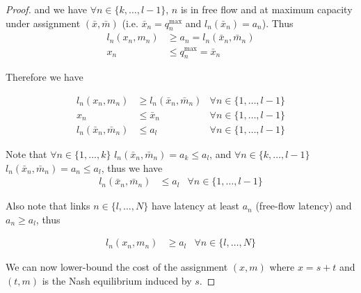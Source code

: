 \begin{proof}
and we have $\forall n \in \{ k, \dots, l-1\}$, $n$ is in free flow and at maximum capacity under assignment $(\bar{x}, \bar{m})$ (i.e. $\bar{x}_n = q^{\max}_n$ and $l_n(\bar{x}_n) = a_n$). Thus
\begin{align*}
l_n(x_n, m_n) &\geq a_n = l_n(\bar{x}_n, \bar{m}_n)\\
x_n &\leq q^{\max}_n = \bar{x}_n
\end{align*}

Therefore we have

\begin{align}
\label{eq:cong_latency}
l_n(x_n, m_n) &\geq l_n(\bar{x}_n, \bar{m}_n) & \forall n \in \{ 1, \dots, l-1\}\\
\label{eq:cong_flow}
x_n &\leq \bar{x}_n &\forall n \in \{ 1, \dots, l-1\}\\
\label{eq:cong_latencybar}
l_n(\bar{x}_n, \bar{m}_n) &\leq a_l &\forall n \in \{ 1, \dots, l-1\}
\end{align}

Note that $\forall n \in \{1, \dots, k\}$ $l_n(\bar{x}_n, \bar{m}_n) = a_k \leq a_l$, and $\forall n \in \{k, \dots, l-1\}$ $l_n(\bar{x}_n, \bar{m}_n) = a_n \leq a_l$, thus we have
\begin{align}
\label{eq:_latency}
l_n(\bar{x}_n, \bar{m}_n) &\leq a_l & \forall n \in \{ 1, \dots, l-1\}
\end{align}


Also note that links $n \in \{ l, \dots, N\}$ have latency at least $a_n$ (free-flow latency) and $a_n \geq a_l$, thus

\begin{align}
\label{eq:ff_latency}
l_n(x_n, m_n) & \geq a_l & \forall n \in \{ l, \dots, N\}
\end{align}


We can now lower-bound the cost of the assignment $(x, m)$ where $x = s+t$ and $(t, m)$ is the Nash equilibrium induced by $s$.


\end{proof}
